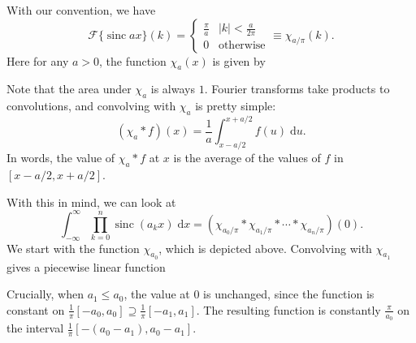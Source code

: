 \documentclass{shortart}
\theoremstyle{definition}
\DeclareMathOperator\sinc{sinc}
\renewcommand\d{\mathrm{d}}
\begin{document}
With our convention, we have
\[
  \mathcal{F}\{\sinc a x\}(k) =
  \begin{cases}
    \frac{\pi}{a} & |k| < \frac{a}{2\pi}\\
    0 & \text{otherwise}
  \end{cases} \equiv \chi_{a/\pi} (k).
\]
Here for any $a > 0$, the function $\chi_a (x)$ is given by
\begin{center}
\end{center}
Note that the area under $\chi_a$ is always $1$. Fourier transforms take products to convolutions, and convolving with $\chi_a$ is pretty simple:
\[
  (\chi_a * f)(x) = \frac{1}{a} \int_{x - a/2}^{x + a/2} f(u) \;\d u.
\]
In words, the value of $\chi_a * f$ at $x$ is the average of the values of $f$ in $[x - a/2, x + a/2]$.

With this in mind, we can look at
\[
  \int_{-\infty}^\infty \prod_{k = 0}^n \sinc (a_k x)\;\d x = (\chi_{a_0/\pi} * \chi_{a_1/\pi} * \cdots * \chi_{a_n/\pi})(0).
\]
We start with the function $\chi_{a_0}$, which is depicted above. Convolving with $\chi_{a_1}$ gives a piecewise linear function
\begin{center}
\end{center}
Crucially, when $a_1 \leq a_0$, the value at $0$ is unchanged, since the function is constant on $\frac{1}{\pi}[-a_0, a_0] \supseteq \frac{1}{\pi}[-a_1, a_1]$. The resulting function is constantly $\frac{\pi}{a_0}$ on the interval $\frac{1}{\pi}[-(a_0 - a_1), a_0 - a_1]$.
\end{document}
